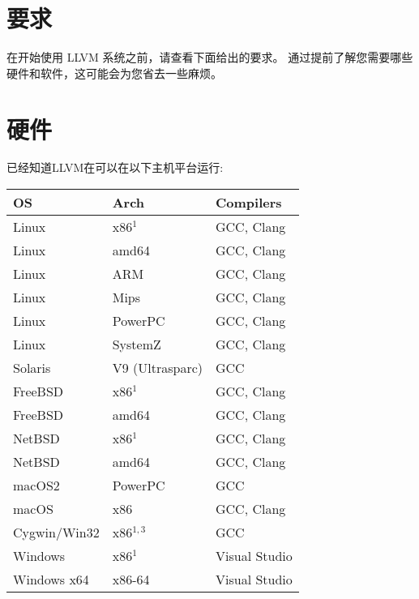 \section{要求 }
\par{在开始使用 LLVM 系统之前，请查看下面给出的要求。 通过提前了解您需要哪些硬件和软件，这可能会为您省去一些麻烦。} 
\section{硬件 }
\par{已经知道LLVM在可以在以下主机平台运行:} 


\begin{tabular}{l l l}
	\textbf{OS} & \textbf{Arch} & \textbf{Compilers} \\
\hline
	Linux 		&	x86$^{1}$	& GCC, Clang    \\  \hline  
	Linux 		&	amd64		& GCC, Clang 	\\  \hline
	Linux 		& 	ARM		& GCC, Clang    \\  \hline
	Linux 		&	Mips		& GCC, Clang	\\  \hline	
	Linux 		&	PowerPC		& GCC, Clang	\\  \hline
	Linux		&	SystemZ		& GCC, Clang	\\  \hline
	Solaris		&	V9 (Ultrasparc)	& GCC		\\  \hline
	FreeBSD		&	x86$^{1}$	& GCC, Clang	\\  \hline
	FreeBSD		&	amd64		& GCC, Clang	\\  \hline
	NetBSD		&	x86$^{1}$	& GCC, Clang	\\  \hline
	NetBSD		&	amd64		& GCC, Clang	\\  \hline
	macOS2		&	PowerPC		& GCC		\\  \hline
	macOS		&	x86		& GCC, Clang	\\  \hline
	Cygwin/Win32	&	x86$^{1,3}$	& GCC		\\  \hline
	Windows		&	x86$^{1}$	& Visual Studio	\\  \hline
	Windows x64 	& 	x86-64		& Visual Studio	\\  \hline
\end{tabular}



